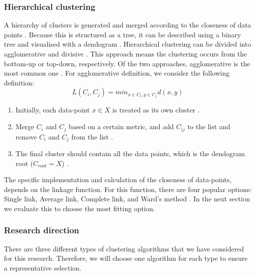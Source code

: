 \subsubsection{Hierarchical clustering}
A hierarchy of clusters is generated and merged according to the closeness of data points \citep{meng_private_2021}. Because this is structured as a tree, it can be described using a binary tree and visualised with a dendogram  \citep{nielsen_hierarchical_2016}.
Hierarchical clustering can be divided into agglomerative and divisive \citep{meng_private_2021}.
This approach means the clustering occurs from the bottom-up or top-down, respectively.
Of the two approaches, agglomerative is the most common one \citep{meng_private_2021}.
For  agglomerative definition, we consider the following definition:
\begin{equation}
  L(C_i, C_j) = min_{x \in C_i, y \in C_j} d(x, y)
\end{equation}
\begin{enumerate}
  \item Initially, each data-point $x \in X$ is treated as its own cluster \citep{nielsen_hierarchical_2016}.
  \item Merge $C_i$ and $C_j$ based on a certain metric, and add $C_{ij}$ to the list and remove $C_i$ and $C_j$ from the list \citep{nielsen_hierarchical_2016}.
  \item The final cluster should contain all the data points, which is the dendogram root ($C_{root} = X$) \citep{nielsen_hierarchical_2016}.
\end{enumerate}
The specific implementation and calculation of the closeness of data-points, depends on the linkage function.
For this function, there are four popular options: Single link, Average link, Complete link, and Ward's method \citep{roux_comparative_2015}. In the next section we evaluate this to choose the most fitting option.

\subsubsection{Research direction}
{There are three different types of clustering algorithms that we have considered for this research.
Therefore, we will choose one algorithm for each type to ensure a representative selection.}

